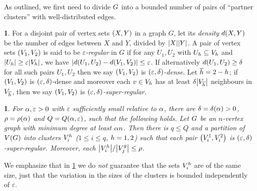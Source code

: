 \documentclass[11pt,english]{article}
\theoremstyle{plain}
\theoremstyle{plain}
\theoremstyle{plain}
\newtheorem{lem}[thm]{\protect\lemmaname}
\theoremstyle{plain}
\theoremstyle{plain}
\theoremstyle{definition}
\newtheorem{defn}[thm]{\protect\definitionname}
\theoremstyle{definition}
\theoremstyle{remark}
\theoremstyle{remark}
\theoremstyle{plain}
\theoremstyle{definition}
\newtheorem{mydefn}[mythm]{\protect\definitionname}
\renewenvironment{defn}{\begin{mydefn}}{\end{mydefn}}
\theoremstyle{definition}
\theoremstyle{plain}
\theoremstyle{plain}
\theoremstyle{plain}
\newtheorem{mylem}[mythm]{\protect\lemmaname}
\renewenvironment{lem}{\begin{mylem}}{\end{mylem}}
\theoremstyle{plain}
\theoremstyle{remark}
\theoremstyle{plain}
\theoremstyle{definition}
\let\originalleft\left
\let\originalright\right
\renewcommand{\left}{\mathopen{}\mathclose\bgroup\originalleft}
\renewcommand{\right}{\aftergroup\egroup\originalright}
\providecommand{\definitionname}{Definition}
\providecommand{\lemmaname}{Lemma}
\begin{document}
As outlined, we first need to divide $G$ into a bounded number of
pairs of ``partner clusters'' with well-distributed edges.
\begin{defn}
For a disjoint pair of vertex sets $\left(X,Y\right)$ in a graph
$G$, let its \emph{density} $d\left(X,Y\right)$ be the number of
edges between $X$ and $Y$, divided by $\left|X\right|\left|Y\right|$.
A pair of vertex sets $\left(V_{1},V_{2}\right)$ is said to be \emph{$\varepsilon$-regular}
in $G$ if for any $U_{1},U_{2}$ with $U_{h}\subseteq V_{h}$ and
$\left|U_{\h}\right|\ge\varepsilon\left|V_{\h}\right|$, we have $\left|d\left(U_{1},U_{2}\right)-d\left(V_{1},V_{2}\right)\right|\le\varepsilon$.
If alternatively $d\left(U_{1},U_{2}\right)\ge\delta$ for all such
pairs $U_{1},U_{2}$ then we say $\left(V_{1},V_{2}\right)$ is \emph{$\left(\varepsilon,\delta\right)$-dense}.
Let $\overline{h}=2-h$; if $\left(V_{1},V_{2}\right)$ is $\left(\varepsilon,\delta\right)$-dense
and moreover each $v\in V_{h}$ has at least $\delta\left|V_{\flip{\h}}\right|$
neighbours in $V_{\overline{h}}$, then we say $\left(V_{1},V_{2}\right)$
is \emph{$\left(\varepsilon,\delta\right)$-super-regular}.\end{defn}
\begin{lem}
\label{lem:partition-into-blobs}For $\alpha,\varepsilon>0$ with $\varepsilon$
sufficiently small relative to $\alpha$, there are $\delta=\delta\left(\a\right)>0$,
$\rho=\rho\left(\a\right)$ and $Q=Q\left(\a,\varepsilon\right)$,
such that the following holds. Let $G$ be an $n$-vertex graph with
minimum degree at least $\alpha n$. Then there is $q\le Q$ and a partition
of $V\left(\G\right)$ into clusters $V_{i}^{h}$ ($1\le i\le q$,
$h=1,2$) such that each pair $\left(V_{i}^{1},V_{i}^{2}\right)$
is $\left(\varepsilon,\delta\right)$-super-regular. Moreover, each
$\left|V_{i}^{\h}\right|/\left|V_{j}^{g}\right|\le\rho$.
\end{lem}
We emphasize that in \ref{lem:partition-into-blobs} we do \emph{not
}guarantee that the sets $V_{i}^{h}$ are of the same size, just
that the variation in the sizes of the clusters is bounded independently
of $\varepsilon$.
\end{document}
